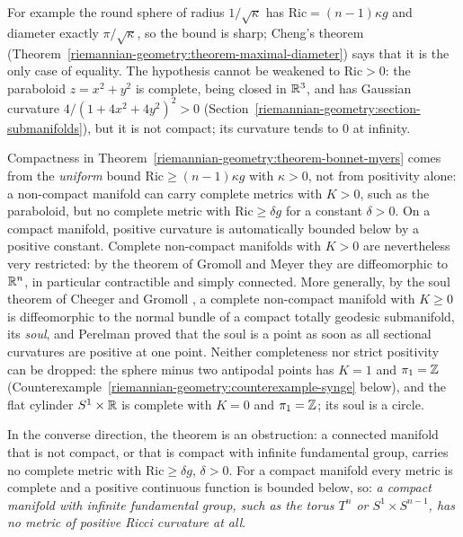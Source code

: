 For example the round sphere of radius $1/\sqrt\kappa$ has $\mathrm{Ric} = (n - 1)\kappa g$ and diameter exactly $\pi/\sqrt\kappa$, so the bound is sharp; Cheng's theorem
(Theorem~\ref{riemannian-geometry:theorem-maximal-diameter}) says that it is the only case of equality. The hypothesis cannot be weakened to $\mathrm{Ric} > 0$: the paraboloid
$z = x^2 + y^2$ is complete, being closed in $\mathbb{R}^3$, and has Gaussian curvature $4/(1 + 4x^2 + 4y^2)^2 > 0$
(Section~\ref{riemannian-geometry:section-submanifolds}), but it is not compact; its curvature tends to $0$ at infinity.

\begin{remark}\label{riemannian-geometry:remark-noncompact-positive}
Compactness in Theorem~\ref{riemannian-geometry:theorem-bonnet-myers} comes from the \emph{uniform} bound $\mathrm{Ric} \geq (n - 1)\kappa g$ with $\kappa > 0$, not from
positivity alone: a non-compact manifold can carry complete metrics with $K > 0$, such as the paraboloid, but no complete metric with $\mathrm{Ric} \geq \delta g$ for a
constant $\delta > 0$. On a compact manifold, positive curvature is automatically bounded below by a positive constant. Complete non-compact manifolds with $K > 0$ are
nevertheless very restricted: by the theorem of Gromoll and Meyer \cite{gromoll-meyer-1969} they are diffeomorphic to $\mathbb{R}^n$, in particular contractible and simply
connected. More generally, by the soul theorem of Cheeger and Gromoll \cite{cheeger-gromoll-1972}, a complete non-compact manifold with $K \geq 0$ is diffeomorphic to the
normal bundle of a compact totally geodesic submanifold, its \emph{soul}, and Perelman \cite{perelman-1994} proved that the soul is a point as soon as all sectional
curvatures are positive at one point. Neither completeness nor strict positivity can be dropped: the sphere minus two antipodal points has $K = 1$ and $\pi_1 = \mathbb{Z}$
(Counterexample~\ref{riemannian-geometry:counterexample-synge} below), and the flat cylinder $S^1 \times \mathbb{R}$ is complete with $K = 0$ and $\pi_1 = \mathbb{Z}$; its soul is a circle.

In the converse direction, the theorem is an obstruction: a connected manifold that is not compact, or that is compact with infinite fundamental group, carries no complete metric with
$\mathrm{Ric} \geq \delta g$, $\delta > 0$. For a compact manifold every metric is complete and a positive continuous function is bounded below, so: \emph{a compact manifold with infinite fundamental
group, such as the torus $T^n$ or $S^1 \times S^{n-1}$, has no metric of positive Ricci curvature at all}.
\end{remark}


